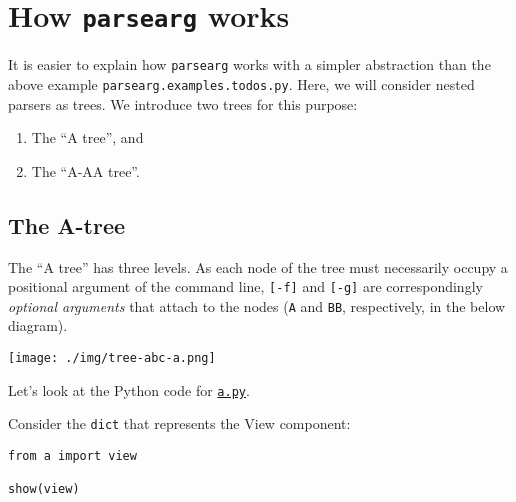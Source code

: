 \documentclass[10pt]{amsart}
\numberwithin{equation}{section}
\begin{document}
\section{How \texttt{parsearg} works}
\label{sec:org1e47af8}
It is easier to explain how \texttt{parsearg} works with a simpler abstraction 
than the above example \texttt{parsearg.examples.todos.py}. Here, we will 
consider nested parsers as trees. We introduce two trees for this purpose:
\begin{enumerate}
\item The ``A tree'', and
\item The ``A-AA tree''.
\end{enumerate}

\subsection{The A-tree}
\label{sec:org9b2ba03}
The ``A tree'' has three levels. As each node of the tree must
necessarily occupy a positional argument of the command line,
\texttt{[-f]} and \texttt{[-g]} are correspondingly \emph{optional arguments} that attach to the nodes 
(\texttt{A} and \texttt{BB}, respectively, in the below diagram). 
\begin{center}
\texttt{[image: ./img/tree-abc-a.png]}
\end{center}

Let's look at the Python code for \href{https://github.com/tharte/parsearg/blob/master/parsearg/examples/a.py}{\texttt{a.py}}.

Consider the \texttt{dict} that represents the View component:
\begin{verbatim}
from a import view

show(view)
\end{verbatim}
\end{document}
